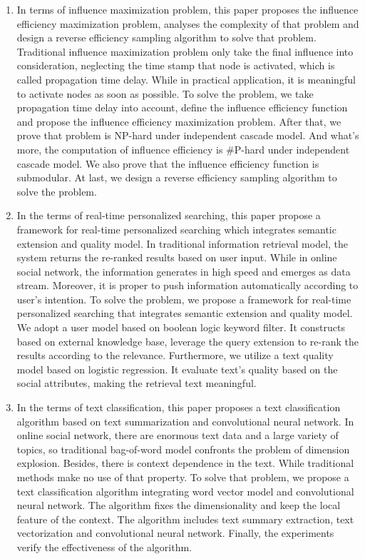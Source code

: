 \begin{eabstract}
\begin{enumerate}
	\item In terms of influence maximization problem, this paper proposes the influence efficiency maximization problem, analyses the complexity of that problem and design a reverse efficiency sampling algorithm to solve that problem. Traditional influence maximization problem only take the final influence into consideration, neglecting the time stamp that node is activated, which is called propagation time delay. While in practical application, it is meaningful to activate nodes as soon as possible. To solve the problem, we take propagation time delay into account, define the influence efficiency function and propose the influence efficiency maximization problem. After that, we prove that problem is NP-hard under independent cascade model. And what's more, the computation of influence efficiency is \#P-hard under independent cascade model. We also prove that the influence efficiency function is submodular. At last, we design a reverse efficiency sampling algorithm to solve the problem.
	\item In the terms of real-time personalized searching, this paper propose a framework for real-time personalized searching which integrates semantic extension and quality model. In traditional information retrieval model, the system returns the re-ranked results based on user input. While in online social network, the information generates in high speed and emerges as data stream. Moreover, it is proper to push information automatically according to user's intention. To solve the problem, we propose a framework for real-time personalized searching that integrates semantic extension and quality model. We adopt a user model based on boolean logic keyword filter. It constructs based on external knowledge base, leverage the query extension to re-rank the results according to the relevance. Furthermore, we utilize a text quality model based on logistic regression. It evaluate text's quality based on the social attributes, making the retrieval text meaningful.
	\item In the terms of text classification, this paper proposes a text classification algorithm based on text summarization and convolutional neural network. In online social network, there are enormous text data and a large variety of topics, so traditional bag-of-word model confronts the problem of dimension explosion. Besides, there is context dependence in the text. While traditional methods make no use of that property. To solve that problem, we propose a text classification algorithm integrating word vector model and convolutional neural network. The algorithm fixes the dimensionality and keep the local feature of the context. The algorithm includes text summary extraction, text vectorization and convolutional neural network. Finally, the experiments verify the effectiveness of the algorithm.

\end{enumerate}
\end{eabstract}
